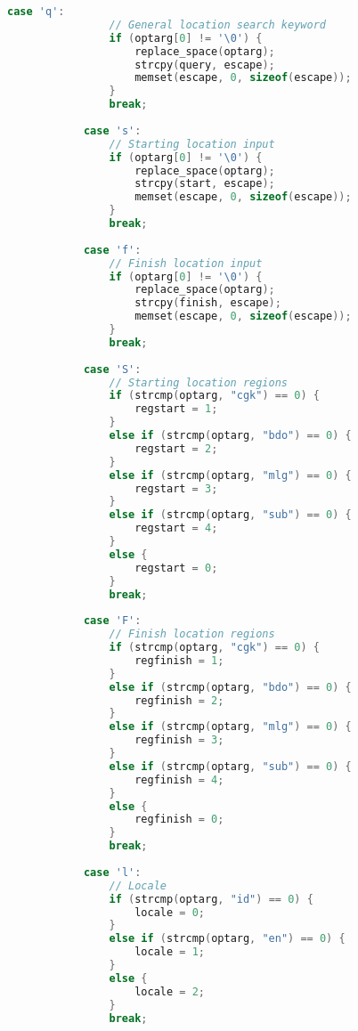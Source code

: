 \begin{lstlisting}[label={appdx:A-main}, language=C, caption=Fungsi utama perkakas (\texttt{main})]
            case 'q':
                // General location search keyword
                if (optarg[0] != '\0') {
                    replace_space(optarg);
                    strcpy(query, escape);
                    memset(escape, 0, sizeof(escape));
                }
                break;
            
            case 's':
                // Starting location input
                if (optarg[0] != '\0') {
                    replace_space(optarg);
                    strcpy(start, escape);
                    memset(escape, 0, sizeof(escape));
                }
                break;
            
            case 'f':
                // Finish location input
                if (optarg[0] != '\0') {
                    replace_space(optarg);
                    strcpy(finish, escape);
                    memset(escape, 0, sizeof(escape));
                }
                break;
            
            case 'S':
                // Starting location regions
                if (strcmp(optarg, "cgk") == 0) {
                    regstart = 1;
                }
                else if (strcmp(optarg, "bdo") == 0) {
                    regstart = 2;
                }
                else if (strcmp(optarg, "mlg") == 0) {
                    regstart = 3;
                }
                else if (strcmp(optarg, "sub") == 0) {
                    regstart = 4;
                }
                else {
                    regstart = 0;
                }
                break;
            
            case 'F':
                // Finish location regions
                if (strcmp(optarg, "cgk") == 0) {
                    regfinish = 1;
                }
                else if (strcmp(optarg, "bdo") == 0) {
                    regfinish = 2;
                }
                else if (strcmp(optarg, "mlg") == 0) {
                    regfinish = 3;
                }
                else if (strcmp(optarg, "sub") == 0) {
                    regfinish = 4;
                }
                else {
                    regfinish = 0;
                }
                break;
            
            case 'l':
                // Locale
                if (strcmp(optarg, "id") == 0) {
                    locale = 0;
                }
                else if (strcmp(optarg, "en") == 0) {
                    locale = 1;
                }
                else {
                    locale = 2;
                }
                break;


\end{lstlisting}
